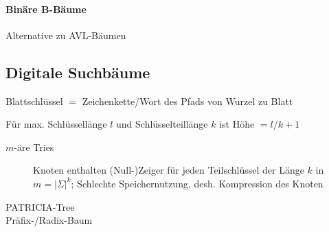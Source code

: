 \paragraph{Binäre B-Bäume} Alternative zu AVL-Bäumen

\subsection{Digitale Suchbäume}

Blattschlüssel $=$ Zeichenkette/Wort des Pfads von Wurzel zu Blatt

Für max. Schlüssellänge $l$ und Schlüsselteillänge $k$ ist Höhe $= l/k + 1$

\begin{description}
  \item [$m$-äre Tries]
        Knoten enthalten (Null-)Zeiger für jeden Teilschlüssel der Länge $k$ in $m = |\Sigma|^k$; Schlechte Speichernutzung, desh. Kompression des Knoten

  \item [PATRICIA-Tree]

  \item [Präfix-/Radix-Baum]
\end{description}